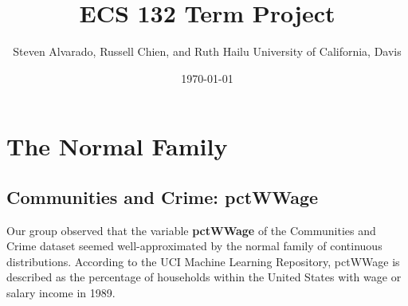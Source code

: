 \documentclass[12pt, letterpaper]{report}
\title{\textbf{ECS 132 Term Project}}
\author{\parbox{\linewidth}{\centering%
  Steven Alvarado, Russell Chien, and Ruth Hailu\endgraf\bigskip
  University of California, Davis}}
\date{\monthyeardate\today}
\begin{document}
\maketitle
\chapter{The Normal Family}
\section{Communities and Crime: pctWWage}

Our group observed that the variable \textbf{pctWWage} of the Communities and Crime dataset seemed well-approximated by the normal family of continuous distributions.
According to the UCI Machine Learning Repository, pctWWage is described as the percentage of households within the United States with wage or salary income in 1989.
\end{document}
